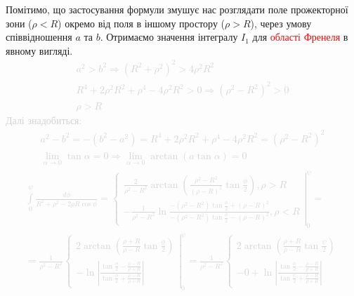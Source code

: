 Помітимо, що застосування формули змушує нас розглядати поле прожекторної зони
($ \rho < R $) окремо від поля в іншому простору ($ \rho > R $), через умову 
співвідношення $ a $ та $ b $. Отримаємо значення інтегралу $ I_1 $ для 
\textcolor{red}{області Френеля} в явному вигляді.
%
\textcolor{lightgray}{ \begin{equation*} \begin{aligned}
a^2 > b^2  \Rightarrow  
\left( R^2 + \rho^2 \right)^2 > 4 \rho^2 R^2 \\
R^4 + 2 \rho^2 R^2 + \rho^4 - 4 \rho^2 R^2 > 0 \Rightarrow 
\left( \rho^2 - R^2 \right)^2 > 0 \\
\rho > R
\end{aligned} \end{equation*} }
%
\textcolor{lightgray}{ Далі знадобиться: }
%
\textcolor{lightgray}{ \begin{equation*} \begin{aligned}
a^2 - b^2 = - \left( b^2 - a^2 \right) = 
R^4 + 2 \rho^2 R^2 + \rho^4 - 4 \rho^2 R^2 = \left( \rho^2 - R^2 \right)^2 \\
\lim_{\alpha \to 0} \tan{\alpha} = 0 \Rightarrow
\lim_{\alpha \to 0} \arctan \left( a \tan{\alpha} \right) = 0
\end{aligned} \end{equation*} }
%
\textcolor{lightgray}{ \begin{equation*} \begin{aligned}
\int \limits_{0}^{\psi} \frac{d \phi}{R^2 + \rho^2 - 2 \rho R \cos \phi} =
\left. \begin{cases}
\frac{2}{\rho^2 - R^2} \arctan \left( \frac{\rho^2 - R^2}
{\left( \rho - R \right)^2} \tan \frac{\phi}{2} \right), \rho > R \\
- \frac{1}{\rho^2 - R^2} \ln
\frac{- \left( \rho^2 - R^2 \right) \tan \frac{\phi}{2} + \left( \rho - R \right)^2}
{- \left( \rho^2 - R^2 \right) \tan \frac{\phi}{2} - \left( \rho - R \right)^2}
, \rho < R
\end{cases} \right|_{0}^{\psi} = \\
= \frac{1}{\rho^2 - R^2} \left. \begin{cases} 
2 \arctan \left( \frac{\rho + R}{\rho - R} \tan \frac{\phi}{2} \right) \\
- \ln \left| \frac{\tan \frac{\phi}{2} - \frac{\rho - R}{\rho + R}} 
{\tan \frac{\phi}{2} + \frac{\rho - R}{\rho + R}} \right|
\end{cases} \right|_{0}^{\psi} = 
\frac{1}{\rho^2 - R^2} \begin{cases} 
2 \arctan \left( \frac{\rho + R}{\rho - R} \tan \frac{\psi}{2} \right) \\
- 0 + \ln \left| \frac{\tan \frac{\psi}{2} - \frac{\rho - R}{\rho + R}}
{\tan \frac{\psi}{2} + \frac{\rho - R}{\rho + R}} \right|
\end{cases}
\end{aligned} \end{equation*} }
